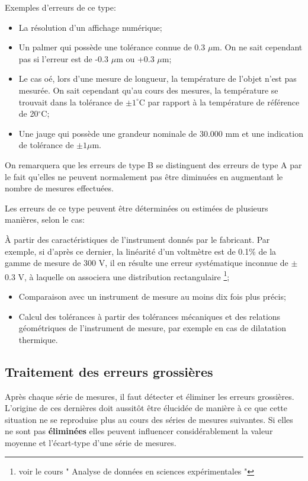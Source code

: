 Exemples d'erreurs de ce type:
\begin{itemize}

    \item La résolution d'un affichage numérique;
    \item Un palmer qui possède une tolérance connue de 0.3 $\mu$m. On ne sait cependant pas si l'erreur est de -0.3 $\mu$m ou +0.3 $\mu$m;
    \item Le cas oé, lors d'une mesure de longueur, la température de l'objet n'est pas mesurée. On sait cependant qu'au cours des mesures, la température se trouvait dans la tolérance de $\pm1^{\circ}$C par rapport à la température de référence de 20$^{\circ}$C;
    \item Une jauge qui possède une grandeur nominale de 30.000 mm et une indication de tolérance de $\pm 1\mu$m.
\end{itemize}
On remarquera que les erreurs de type B se distinguent des erreurs de type A par le fait qu'elles ne peuvent normalement pas être diminuées en augmentant le nombre de mesures effectuées.

Les erreurs de ce type peuvent être déterminées ou estimées de plusieurs manières, selon le cas:

À partir des caractéristiques de l'instrument donnés par le fabricant. Par exemple, si d'après ce dernier, la linéarité d'un voltmètre est de 0.1\% de la gamme de mesure de 300 V, il en résulte une erreur systématique inconnue de $\pm$0.3 V, à laquelle on associera une distribution rectangulaire \footnote{voir le cours " Analyse de données en sciences expérimentales "};
\begin{itemize}
    \item Comparaison avec un instrument de mesure au moins dix fois plus précis;
    \item Calcul des tolérances à partir des tolérances mécaniques et des relations géométriques de l'instrument de mesure, par exemple en cas de dilatation thermique.
\end{itemize}

\subsection{Traitement des erreurs grossières}

Après chaque série de mesures, il faut détecter et éliminer les erreurs grossières. L'origine de ces dernières doit aussitôt être élucidée de manière à ce que cette situation ne se reproduise plus au cours des séries de mesures suivantes. Si elles ne sont pas \textbf{éliminées} elles peuvent influencer considérablement la valeur moyenne et l'écart-type d'une série de mesures.

